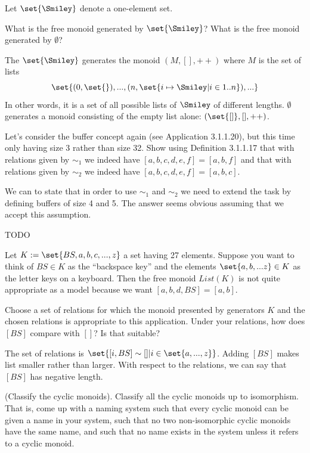 \documentclass{article}
\begin{document}

Let $\set{\Smiley}$ denote a one-element set.

\es What is the free monoid generated by $\set{\Smiley}$?
\ei What is the free monoid generated by $\emptyset$?
\ee

\ans

\es The $\set{\Smiley}$ generates the monoid $(M,[],++)$ where $M$ is the set of
    lists \[\set{(0,\set{}), ..., (n,\set{i \mapsto \Smiley | i \in {1..n}}),
    ...}\] In other words, it is a set of all possible lists of $\Smiley$ of
    different lengths.
\ei $\emptyset$ generates a monoid consisting of the empty list alone:
    $(\set{[]}, [], ++)$.
\ee


Let's consider the buffer concept again (see Application 3.1.1.20), but this
time only having size 3 rather than size 32. Show using Definition 3.1.1.17 that
with relations given by $\sim_1$ we indeed have $[a, b, c, d, e, f] = [a, b, f]$
and that with relations given by $\sim_2$ we indeed have $[a, b, c, d, e, f] =
[a, b, c]$.

\ans

We can to state that in order to use $\sim_1$ and $\sim_2$ we need to extend the
task by defining buffers of size 4 and 5. The answer seems obvious assuming that
we accept this assumption.

TODO


Let $K := \set{BS, a, b, c, ... , z}$ a set having 27 elements. Suppose you want
to think of $BS \in K$ as the “backspace key” and the elements $\set{a, b, ...
z} \in K$ as the letter keys on a keyboard. Then the free monoid $List(K)$ is
not quite appropriate as a model because we want $[a, b, d, BS] = [a, b]$.

\es Choose a set of relations for which the monoid presented by generators $K$
    and the chosen relations is appropriate to this application.
\ei Under your relations, how does $[BS]$ compare with $[]$? Is that suitable?
\ee

\ans


\es The set of relations is $\set{[i,BS] \sim [] | i \in \set{a,..., z}}$.
\ei Adding $[BS]$ makes list smaller rather than larger. With respect to the
    relations, we can say that $[BS]$ has negative length.
\ee


(Classify the cyclic monoids). Classify all the cyclic monoids up to
isomorphism. That is, come up with a naming system such that every cyclic monoid
can be given a name in your system, such that no two non-isomorphic cyclic
monoids have the same name, and such that no name exists in the system unless it
refers to a cyclic monoid.
\end{document}
